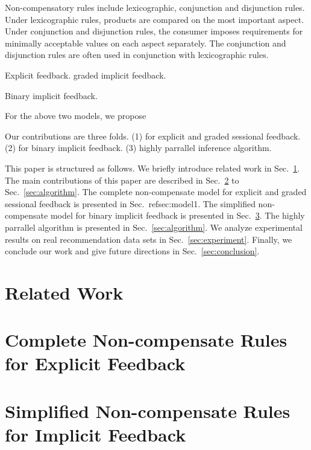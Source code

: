 \documentclass[conference]{IEEEtran}
\begin{document}
Non-compensatory rules include lexicographic, conjunction and disjunction rules. Under lexicographic rules, products are compared on the most important aspect. Under conjunction and disjunction rules, the consumer imposes requirements for minimally acceptable values on each aspect separately. The conjunction and disjunction rules are often used in conjunction with lexicographic rules.
  
Explicit feedback. graded implicit feedback.  

Binary implicit feedback. 

For the above two models, we propose 

Our contributions are three folds. (1) for explicit and graded sessional feedback. (2) for binary implicit feedback. (3) highly parrallel inference algorithm. 

This paper is structured as follows. We briefly introduce related work in Sec.~\ref{sec:relatedwork}. The main contributions of this paper are described in Sec.~\ref{sec:model1} to Sec.~\ref{sec:algorithm}. The complete non-compensate model for explicit and graded sessional feedback is presented in Sec.~ref{sec:model1}. The simplified non-compensate model for binary implicit feedback is presented in Sec.~\ref{sec:model2}. The highly parrallel algorithm is presented in Sec.~\ref{sec:algorithm}. We analyze experimental results on real recommendation data sets in Sec.~\ref{sec:experiment}. Finally, we conclude our work and give future directions in Sec.~\ref{sec:conclusion}. 


\section{Related Work}\label{sec:relatedwork}



\section{Complete Non-compensate Rules for Explicit Feedback}\label{sec:model1}

\section{Simplified Non-compensate Rules for Implicit Feedback}\label{sec:model2}
\end{document}
